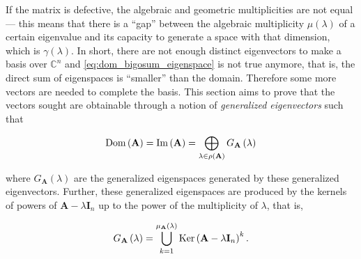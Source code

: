 	If the matrix is defective, the algebraic and geometric multiplicities are not equal — this means that there is a ``gap'' between the algebraic multiplicity $\mu\left(\lambda\right)$ of a certain eigenvalue and its capacity to generate a space with that dimension, which is $\gamma\left(\lambda\right)$. In short, there are not enough distinct eigenvectors to make a basis over $\mathbb{C}^n$ and \eqref{eq:dom_bigosum_eigenspace} is not true anymore, that is, the direct sum of eigenspaces is ``smaller'' than the domain. Therefore some more vectors are needed to complete the basis. This section aims to prove that the vectors sought are obtainable through a notion of \textit{generalized eigenvectors} such that

\begin{equation} \operatorname{Dom}\left(\mathbf{A}\right) = \operatorname{Im}\left(\mathbf{A}\right) = \bigoplus_{\lambda\in\rho\left(\mathbf{A}\right)} G_\mathbf{A}\left(\lambda\right)\label{eq:dom_bigosum_eigenspace_general}\end{equation}

	\noindent where $G_\mathbf{A}\left(\lambda\right)$ are the generalized eigenspaces generated by these generalized eigenvectors. Further, these generalized eigenspaces are produced by the kernels of powers of $\mathbf{A} - \lambda\mathbf{I}_n$ up to the power of the multiplicity of $\lambda$, that is, 

\begin{equation} G_\mathbf{A}\left(\lambda\right) = \bigcup_{k=1}^{\mu_\mathbf{A}\left(\lambda\right)} \operatorname{Ker}\left(\mathbf{A} - \lambda\mathbf{I}_n\right)^k. \end{equation}

